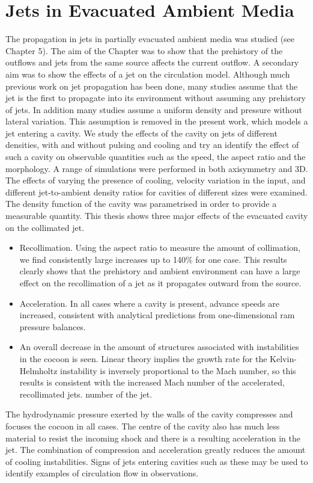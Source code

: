 \section{Jets in Evacuated Ambient Media}
The propagation in jets in partially evacuated ambient media was studied (see
Chapter 5).
The aim of the Chapter was to show that the prehistory of the outflows and jets from the same source affects the current outflow.
A secondary aim was to show the effects of a jet on the circulation model.
 Although much previous work on jet propagation has been done, many studies assume that
 the jet is the first to propagate into its environment without assuming any
 prehistory of jets. In addition many studies assume a uniform density and
 pressure without lateral variation. 
 This assumption is removed in the present work, which models a jet entering a cavity. We study the effects of the cavity on jets of
 different densities, with and without pulsing and cooling and try an identify
 the effect of such a cavity on observable quantities such as the speed, the aspect ratio and the
 morphology. 
A range of simulations were performed in both axisymmetry and 3D.
The effects of varying the presence of cooling, velocity variation in the input,
and different jet-to-ambient density ratios for cavities of different sizes were examined.
The density function of the cavity was parametrised in order to provide a measurable quantity.
This thesis shows three major effects of the evacuated cavity on the collimated jet.
\begin{itemize}
\item Recollimation. Using the aspect ratio to measure the amount of collimation,
we find consistently large increases up to 140\% for one case. This results
clearly shows that the prehistory and ambient environment can have a large
effect on the recollimation of a jet as it propagates outward from the source.
\item Acceleration. In all cases where a cavity is present, advance speeds are
increased, consistent with analytical predictions from one-dimensional ram pressure balances.
\item An overall decrease in the amount of structures associated with
instabilities in the cocoon is seen. 
Linear theory implies the growth rate for the Kelvin-Helmholtz instability is
inversely proportional to the Mach number,  
so this results is consistent with the increased Mach number of the accelerated,
recollimated jets.
number of the jet.
\end{itemize}
The hydrodynamic pressure exerted by the walls of the cavity compresses and focuses the cocoon in all cases. 
The centre of the cavity also has much less material to resist the incoming shock and there is a resulting acceleration in the jet.
The combination of compression and acceleration greatly reduces the amount of cooling instabilities. 
Signs of jets entering cavities such as these may be used to identify examples of circulation flow in observations.



